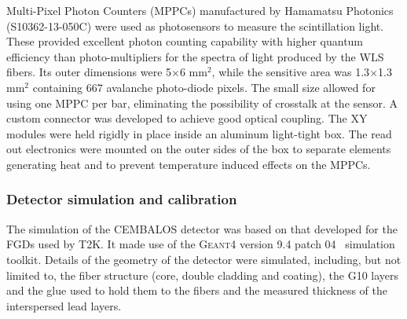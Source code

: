 Multi-Pixel Photon Counters (MPPCs) manufactured by Hamamatsu Photonics (S10362-13-050C) were used as photosensors to measure the scintillation light. These provided excellent photon counting capability with higher quantum efficiency than photo-multipliers for the spectra of light produced by the WLS fibers. Its outer dimensions were 5$\times$6 mm$^2$, while the sensitive area was 1.3$\times$1.3 mm$^2$ containing 667 avalanche photo-diode pixels. The small size allowed for using one MPPC per bar, eliminating the possibility of crosstalk at the sensor. A custom connector was developed to achieve good optical coupling.
The XY modules were {\color{red} held rigidly in place} inside an aluminum light-tight box. The read out electronics were mounted on the outer sides of the box to separate elements generating heat and to prevent temperature induced effects on the MPPCs. 


\subsubsection{\bf Detector simulation and calibration}\label{section:calibration}
The simulation of the CEMBALOS detector was based on that developed for the FGDs used by T2K. It made use of the \textsc{Geant4} version 9.4 patch 04~\cite{geant} simulation toolkit. Details of the geometry of the detector were simulated, including, but not limited to, the fiber structure (core, double cladding and coating), the G10 layers and the glue used to hold them to the fibers and the measured thickness of the interspersed lead layers.

